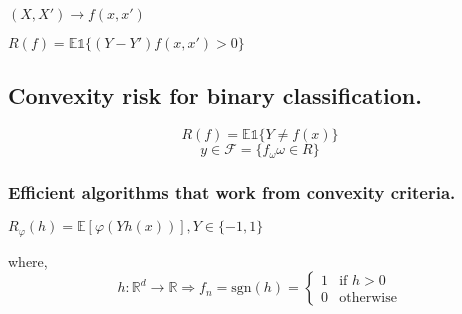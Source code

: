         $(X,X') \rightarrow f(x,x')$

        $R(f)=\mathbb{E}\mathds{1}\{(Y-Y')f(x,x')>0\}$

	   \subsection{Convexity risk for binary classification.}

			\[
				R(f) = \mathbb{E} \mathds{1}\{Y\neq f(x)\}
			\]
			\[
				y\in \mathcal{F}=\{f_{\omega}\omega \in R\}
			\]

			\subsubsection{Efficient algorithms that work from convexity criteria.}
					$R_{\varphi}(h)=\mathbb{E}[\varphi (Yh(x))], Y \in \{-1,1\}$

					where,
					\[
						h:\mathbb{R}^d\rightarrow\mathbb{R} \Rightarrow f_n=
							\mbox{sgn}(h)=\begin{cases}
        																1  & \mbox{if } h>0 \\
       																0 & \mbox{otherwise}
        														\end{cases}
					\]


